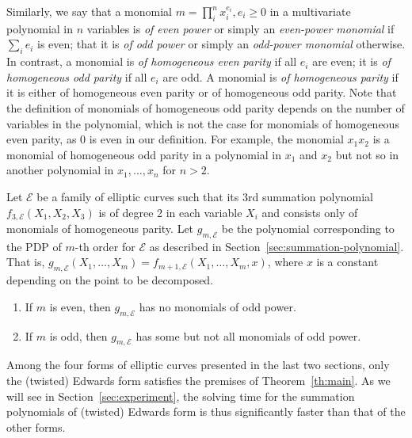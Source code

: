 Similarly, we say that a monomial $m=\prod_i^n x_i^{e_i},e_i\geq 0$ in
a multivariate polynomial in $n$ variables is \emph{of even power} or
simply an \emph{even-power monomial} if $\sum_i e_i$ is even; that it
is \emph{of odd power} or simply an \emph{odd-power monomial}
otherwise.
%
In contrast, a monomial is \emph{of homogeneous even parity} if all
$e_i$ are even; it is \emph{of homogeneous odd parity} if all $e_i$
are odd.
%
A monomial is \emph{of homogeneous parity} if it is either of
homogeneous even parity or of homogeneous odd parity.
%
Note that the definition of monomials of homogeneous odd parity
depends on the number of variables in the polynomial, which is not the
case for monomials of homogeneous even parity, as 0 is even in our
definition.
%
For example, the monomial $x_1x_2$ is a monomial of homogeneous odd
parity in a polynomial in $x_1$ and $x_2$ but not so in another
polynomial in $x_1,\ldots,x_n$ for $n>2$.
%
\begin{theorem}
  \label{th:main}
  Let $\mathcal E$ be a family of elliptic curves such that its 3rd
  summation polynomial $f_{3,\mathcal E}(X_1,X_2,X_3)$ is of degree 2
  in each variable $X_i$ and consists only of monomials of homogeneous
  parity.
  Let $g_{m,\mathcal E}$ be the polynomial corresponding to the PDP of
  $m$-th order for $\mathcal E$ as described in
  Section~\ref{sec:summation-polynomial}.
  That is,
  $g_{m,\mathcal E}(X_1,\ldots,X_m)=f_{m+1,\mathcal
    E}(X_1,\ldots,X_m,x)$, where $x$ is a constant depending on the
  point to be decomposed.
  \begin{enumerate}
  \item If $m$ is even, then $g_{m,\mathcal E}$ has no monomials of
    odd power.
  \item If $m$ is odd, then $g_{m,\mathcal E}$ has some but not all
    monomials of odd power.
  \end{enumerate}
\end{theorem}
%
Among the four forms of elliptic curves presented in the last two
sections, only the (twisted) Edwards form satisfies the premises of
Theorem~\ref{th:main}.
%
As we will see in Section~\ref{sec:experiment}, the solving time for
the summation polynomials of (twisted) Edwards form is thus
significantly faster than that of the other forms.

